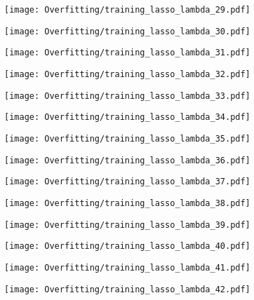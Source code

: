 \documentclass[xcolor=pdftex,dvipsnames,table]{beamer}
\begin{document}
\frame
{
	\begin{center}
		\texttt{[image: Overfitting/training\_lasso\_lambda\_29.pdf]}
	\end{center}
}
\frame
{
	\begin{center}
		\texttt{[image: Overfitting/training\_lasso\_lambda\_30.pdf]}
	\end{center}
}
\frame
{
	\begin{center}
		\texttt{[image: Overfitting/training\_lasso\_lambda\_31.pdf]}
	\end{center}
}
\frame
{
	\begin{center}
		\texttt{[image: Overfitting/training\_lasso\_lambda\_32.pdf]}
	\end{center}
}
\frame
{
	\begin{center}
		\texttt{[image: Overfitting/training\_lasso\_lambda\_33.pdf]}
	\end{center}
}
\frame
{
	\begin{center}
		\texttt{[image: Overfitting/training\_lasso\_lambda\_34.pdf]}
	\end{center}
}
\frame
{
	\begin{center}
		\texttt{[image: Overfitting/training\_lasso\_lambda\_35.pdf]}
	\end{center}
}
\frame
{
	\begin{center}
		\texttt{[image: Overfitting/training\_lasso\_lambda\_36.pdf]}
	\end{center}
}
\frame
{
	\begin{center}
		\texttt{[image: Overfitting/training\_lasso\_lambda\_37.pdf]}
	\end{center}
}
\frame
{
	\begin{center}
		\texttt{[image: Overfitting/training\_lasso\_lambda\_38.pdf]}
	\end{center}
}
\frame
{
	\begin{center}
		\texttt{[image: Overfitting/training\_lasso\_lambda\_39.pdf]}
	\end{center}
}
\frame
{
	\begin{center}
		\texttt{[image: Overfitting/training\_lasso\_lambda\_40.pdf]}
	\end{center}
}
\frame
{
	\begin{center}
		\texttt{[image: Overfitting/training\_lasso\_lambda\_41.pdf]}
	\end{center}
}
\frame
{
	\begin{center}
		\texttt{[image: Overfitting/training\_lasso\_lambda\_42.pdf]}
	\end{center}
}
\end{document}
